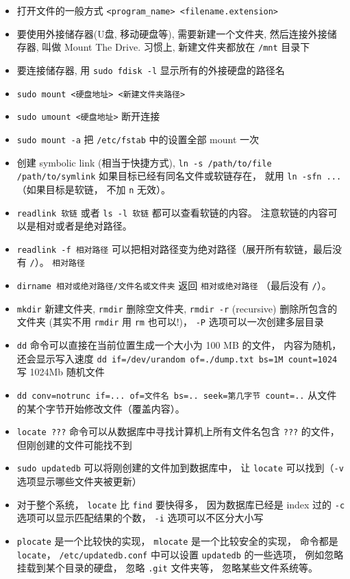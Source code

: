 \begin{itemize}
\item 打开文件的一般方式 \verb`<program_name> <filename.extension>`
\item 要使用外接储存器(U盘, 移动硬盘等), 需要新建一个文件夹, 然后连接外接储存器, 叫做 Mount The Drive. 习惯上, 新建文件夹都放在 \verb`/mnt` 目录下
\item 要连接储存器, 用 \verb`sudo fdisk -l` 显示所有的外接硬盘的路径名
\item \verb`sudo mount <硬盘地址> <新建文件夹路径>`
\item \verb`sudo umount <硬盘地址>` 断开连接
\item \verb`sudo mount -a` 把 \verb|/etc/fstab| 中的设置全部 mount 一次
\item 创建 symbolic link (相当于快捷方式), \verb`ln -s /path/to/file /path/to/symlink` 如果目标已经有同名文件或软链存在， 就用 \verb|ln -sfn ...| （如果目标是软链， 不加 \verb|n| 无效）。
\item \verb|readlink 软链| 或者 \verb|ls -l 软链| 都可以查看软链的内容。 注意软链的内容可以是相对或者是绝对路径。
\item \verb|readlink -f 相对路径| 可以把相对路径变为绝对路径（展开所有软链，最后没有 \verb|/|）。 \verb|相对路径|
\item \verb|dirname 相对或绝对路径/文件名或文件夹| 返回 \verb|相对或绝对路径| （最后没有 \verb|/|）。
\item \verb`mkdir` 新建文件夹, \verb`rmdir` 删除空文件夹, \verb`rmdir -r` (recursive) 删除所包含的文件夹 (其实不用 \verb`rmdir` 用 \verb`rm` 也可以!)， \verb`-P` 选项可以一次创建多层目录
\item \verb`dd` 命令可以直接在当前位置生成一个大小为 100 MB 的文件， 内容为随机， 还会显示写入速度
\verb`dd if=/dev/urandom of=./dump.txt bs=1M count=1024` 写 1024Mb 随机文件
\item \verb|dd conv=notrunc if=... of=文件名 bs=.. seek=第几字节 count=..|  从文件的某个字节开始修改文件（覆盖内容）。
\item \verb`locate ???` 命令可以从数据库中寻找计算机上所有文件名包含 \verb`???` 的文件， 但刚创建的文件可能找不到
\item \verb`sudo updatedb` 可以将刚创建的文件加到数据库中， 让 \verb`locate` 可以找到（\verb|-v| 选项显示哪些文件夹被更新）
\item 对于整个系统， \verb`locate` 比 \verb`find` 要快得多， 因为数据库已经是 index 过的 \verb`-c` 选项可以显示匹配结果的个数， \verb`-i` 选项可以不区分大小写
\item \verb|plocate| 是一个比较快的实现， \verb|mlocate| 是一个比较安全的实现， 命令都是 \verb|locate|， \verb|/etc/updatedb.conf| 中可以设置 \verb|updatedb| 的一些选项， 例如忽略挂载到某个目录的硬盘， 忽略 \verb|.git| 文件夹等， 忽略某些文件系统等。

\end{itemize}
